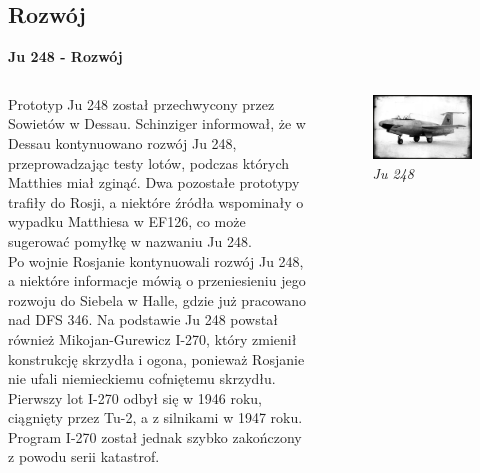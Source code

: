 
\subsection{Rozwój}


\begin{frame}{\Huge{\textbf{Ju 248 - Rozwój}}}
	\begin{columns}
			\justifying
			
Prototyp Ju 248 został przechwycony przez Sowietów w Dessau. Schinziger informował, że w Dessau kontynuowano rozwój Ju 248, przeprowadzając testy lotów, podczas których Matthies miał zginąć. Dwa pozostałe prototypy trafiły do Rosji, a niektóre źródła wspominały o wypadku Matthiesa w EF126, co może sugerować pomyłkę w nazwaniu Ju 248. \\
Po wojnie Rosjanie kontynuowali rozwój Ju 248, a niektóre informacje mówią o przeniesieniu jego rozwoju do Siebela w Halle, gdzie już pracowano nad DFS 346. Na podstawie Ju 248 powstał również Mikojan-Gurewicz I-270, który zmienił konstrukcję skrzydła i ogona, ponieważ Rosjanie nie ufali niemieckiemu cofniętemu skrzydłu. Pierwszy lot I-270 odbył się w 1946 roku, ciągnięty przez Tu-2, a z silnikami w 1947 roku. Program I-270 został jednak szybko zakończony z powodu serii katastrof.
			
			\begin{figure}
				\centering
				\includegraphics[scale=0.21]{images/ju248-02.jpg}
				\caption{\textit{Ju 248}}
			\end{figure}
	\end{columns}
\end{frame}